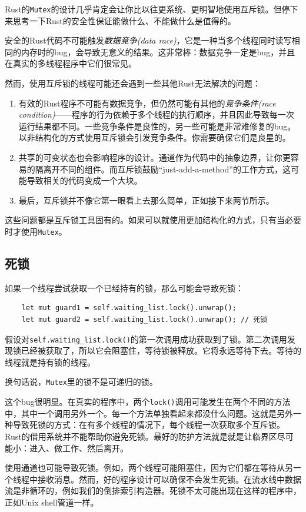 Rust的\texttt{Mutex}的设计几乎肯定会让你比以往更系统、更明智地使用互斥锁。但停下来思考一下Rust的安全性保证能做什么、不能做什么是值得的。

安全的Rust代码不可能触发\emph{数据竞争(data race)}，它是一种当多个线程同时读写相同的内存时的bug，会导致无意义的结果。这非常棒：数据竞争一定是bug，并且在真实的多线程程序中它们很常见。

然而，使用互斥锁的线程可能还会遇到一些其他Rust无法解决的问题：
\begin{enumerate}
    \item 有效的Rust程序不可能有数据竞争，但仍然可能有其他的\emph{竞争条件(race condition)}——程序的行为依赖于多个线程的执行顺序，并且因此导致每一次运行结果都不同。一些竞争条件是良性的，另一些可能是非常难修复的bug。以非结构化的方式使用互斥锁会引发竞争条件。你需要确保它们是良星的。
    \item 共享的可变状态也会影响程序的设计。通道作为代码中的抽象边界，让你更容易的隔离开不同的组件。而互斥锁鼓励“just-add-a-method”的工作方式，这可能导致相关的代码变成一个大块。
    \item 最后，互斥锁并不像它第一眼看上去那么简单，正如接下来两节所示。
\end{enumerate}

这些问题都是互斥锁工具固有的。如果可以就使用更加结构化的方式，只有当必要时才使用\texttt{Mutex}。

\subsection{死锁}
如果一个线程尝试获取一个已经持有的锁，那么可能会导致死锁：
\begin{verbatim}
    let mut guard1 = self.waiting_list.lock().unwrap();
    let mut guard2 = self.waiting_list.lock().unwrap(); // 死锁
\end{verbatim}

假设对\texttt{self.waiting\_list.lock()}的第一次调用成功获取到了锁。第二次调用发现锁已经被获取了，所以它会阻塞住，等待锁被释放。它将永远等待下去。等待的线程就是持有锁的线程。

换句话说，\texttt{Mutex}里的锁不是可递归的锁。

这个bug很明显。在真实的程序中，两个\texttt{lock()}调用可能发生在两个不同的方法中，其中一个调用另外一个。每一个方法单独看起来都没什么问题。这就是另外一种导致死锁的方式：在有多个线程的情况下，每个线程一次获取多个互斥锁。Rust的借用系统并不能帮助你避免死锁。最好的防护方法就是就是让临界区尽可能小：进入、做工作、然后离开。

使用通道也可能导致死锁。例如，两个线程可能阻塞住，因为它们都在等待从另一个线程中接收消息。然而，好的程序设计可以确保不会发生死锁。在流水线中数据流是非循环的，例如我们的倒排索引构造器。死锁不太可能出现在这样的程序中，正如Unix shell管道一样。

